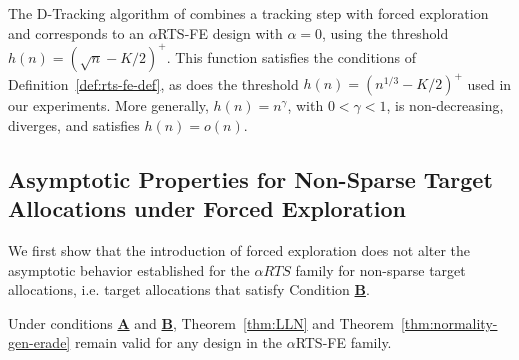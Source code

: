 {\color{revisiongreen}
\begin{example}
The D-Tracking algorithm of \cite{garivier2016optimal} combines a tracking step with forced exploration and corresponds to an \(\alpha\)RTS-FE design with \(\alpha=0\), using the threshold \(h(n)=(\sqrt n-K/2)^+\). This function satisfies the conditions of Definition~\ref{def:rts-fe-def}, as does the threshold \(h(n)=(n^{1/3}-K/2)^+\) used in our experiments. More generally, \(h(n)=n^\gamma\), with \(0<\gamma<1\), is non-decreasing, diverges, and satisfies \(h(n)=o(n)\).
\end{example}}

\subsection{Asymptotic Properties for Non-Sparse Target Allocations under Forced Exploration}

We first show that the introduction of forced exploration does not alter the asymptotic behavior established for the \(\alpha RTS\) family for non-sparse target allocations, i.e. target allocations that satisfy {Condition} \hyperlink{CB}{\textbf{B}}.

\begin{theorem}\label{thm:forced} Under conditions \hyperlink{CA}{\textbf{A}} and \hyperlink{CB}{\textbf{B}}, Theorem~\ref{thm:LLN} and Theorem~\ref{thm:normality-gen-erade} %
	remain valid for any design in the \(\alpha\)RTS-FE family.
\end{theorem}




